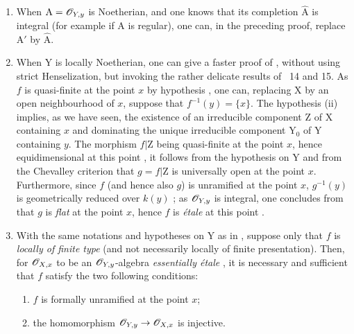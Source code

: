 \begin{remark}[18.10.2]
\label{IV.18.10.2}
\medskip\noindent
\begin{enumerate}[label=(\roman*)]
  \item When $\mathrm{A}=\mathscr{O}_{Y,y}$ is Noetherian, and one knows that its completion $\hat{\mathrm{A}}$ is integral (for example if $\mathrm{A}$ is regular), one can, in the preceding proof, replace $\mathrm{A}'$ by $\hat{\mathrm{A}}$.
  \item When $\mathrm{Y}$ is locally Noetherian, one can give a faster proof of , without using strict Henselization, but invoking the rather delicate results of \textsection\textsection~14 and 15.
As $f$ is quasi-finite at the point $x$ by hypothesis , one can, replacing $\mathrm{X}$ by an open neighbourhood of $x$, suppose that $f^{-1}(y)=\{x\}$.
The hypothesis (ii) implies, as we have seen, the existence of an irreducible component $\mathrm{Z}$ of $\mathrm{X}$ containing $x$ and dominating the unique irreducible component $\mathrm{Y}_0$ of $\mathrm{Y}$ containing $y$.
The morphism $f|\mathrm{Z}$ being quasi-finite at the point $x$, hence equidimensional at this point , it follows from the hypothesis on $\mathrm{Y}$ and from the Chevalley criterion  that $g=f|\mathrm{Z}$ is universally open at the point $x$.
Furthermore, since $f$ (and hence also $g$) is unramified at the point $x$, $g^{-1}(y)$ is geometrically reduced over $k(y)$ ; as $\mathscr{O}_{Y,y}$ is integral, one concludes from  that $g$ is \emph{flat} at the point $x$, hence $f$ is \emph{\'etale} at this point .
  \item With the same notations and hypotheses on $\mathrm{Y}$ as in , suppose only that $f$ is \emph{locally of finite type} (and not necessarily locally of finite presentation).
Then, for $\mathscr{O}_{X,x}$ to be an $\mathscr{O}_{Y,y}$-algebra \emph{essentially \'etale} , it is necessary and sufficient that $f$ satisfy the two following conditions:
\begin{enumerate}[label=\arabic*\textsuperscript{o}]
  \item $f$ is formally unramified at the point $x$;
  \item the homomorphism $\mathscr{O}_{Y,y}\to\mathscr{O}_{X,x}$ is injective.
\end{enumerate}


\end{enumerate}
\end{remark}
